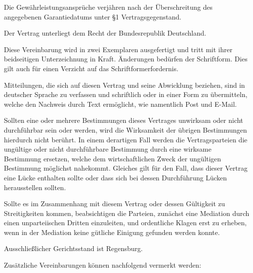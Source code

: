 \documentclass[article, 11pt,a4paper, titlepage, parskip=half, bibliography=totocnumbered]{scrreprt}
\begin{document}
\begin{contract}
				
		
		Die Gewährleistungsansprüche verjähren nach der Überschreitung des angegebenen Garantiedatums unter §1 Vertragsgegenstand.
				
		
		
		Der Vertrag unterliegt dem Recht der Bundesrepublik Deutschland.
		
		Diese Vereinbarung wird in zwei Exemplaren ausgefertigt und tritt mit ihrer beidseitigen Unterzeichnung in Kraft. Änderungen bedürfen der Schriftform. Dies gilt auch für einen Verzicht auf das Schriftformerfordernis.
		
		Mitteilungen, die sich auf diesen Vertrag und seine Abwicklung beziehen, sind in deutscher Sprache zu verfassen und schriftlich oder in einer Form zu übermitteln, welche den Nachweis durch Text ermöglicht, wie namentlich Post und E-Mail.
		
		
		
		
		Sollten eine oder mehrere Bestimmungen dieses Vertrages unwirksam oder nicht durchführbar sein oder werden, wird die Wirksamkeit der übrigen Bestimmungen hierdurch nicht berührt. In einem derartigen Fall werden die Vertragsparteien die ungültige oder nicht durchführbare Bestimmung durch eine wirksame Bestimmung ersetzen, welche dem wirtschaftlichen Zweck der ungültigen Bestimmung möglichst nahekommt. Gleiches gilt für den Fall, dass dieser Vertrag eine Lücke enthalten sollte oder dass sich bei dessen Durchführung Lücken herausstellen sollten.
		
		
		
		Sollte es im Zusammenhang mit diesem Vertrag oder dessen Gültigkeit zu Streitigkeiten kommen, beabsichtigen die Parteien, zunächst eine Mediation durch einen unparteiischen Dritten einzuleiten, und ordentliche Klagen erst zu erheben, wenn in der Mediation keine gütliche Einigung gefunden werden konnte.
		
		Ausschließlicher Gerichtsstand ist Regensburg.

		Zusätzliche Vereinbarungen können nachfolgend vermerkt werden: \\
		\newpage
		

\end{contract}
\end{document}
